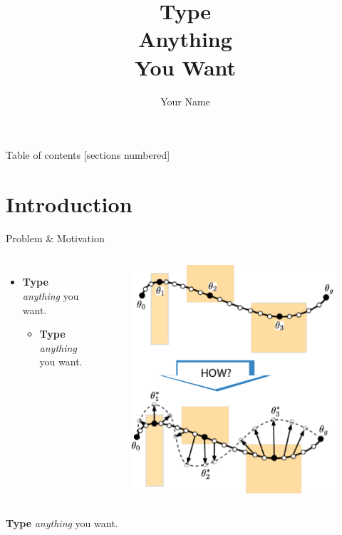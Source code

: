 \documentclass[8pt, compress]{beamer}
\title{
Type \\[6pt] Anything \\[6pt] You Want
}
\date{}
\author{Your Name}
\institute{UIN: xxxxxxxxx}
\begin{document}
\maketitle

\begin{frame}{Table of contents}
  [sections numbered]
  \tableofcontents%
\end{frame}

\section{Introduction}

\begin{frame}{Problem \& Motivation}
\begin{columns}[T,onlytextwidth]
    \begin{itemize}\setlength\itemsep{0.5em}
        \item \textbf{Type} \textit{anything} you want.
        \begin{itemize}\setlength\itemsep{0.5em}
            \item \textbf{Type} \textit{anything} you want.
        \end{itemize}
    \end{itemize}

    \begin{figure}
        \centering
        \includegraphics[width=1\linewidth]{figures/PDF/prob_state.pdf}
    \end{figure}
\end{columns}
\textbf{Type} \textit{anything} you want.
\end{frame}
\end{document}
